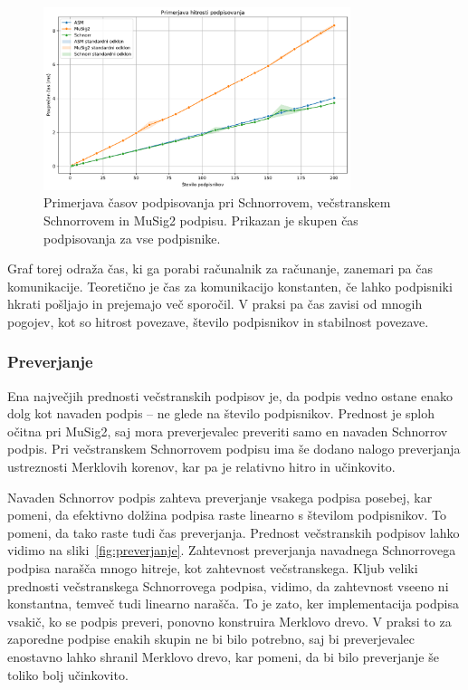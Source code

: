 \documentclass[isrm2, tisk]{fmfdelo}
\begin{document}
\begin{figure}[ht]
  \centering
  \includegraphics[width=0.8\textwidth]{images/benchmark_Signing.pdf}
  \caption[Podpisovanje.]{Primerjava časov podpisovanja pri Schnorrovem, večstranskem Schnorrovem
      in MuSig2 podpisu. Prikazan je skupen čas podpisovanja za vse podpisnike.}
  \label{fig:podpisovanje}
\end{figure}

Graf torej odraža čas, ki ga porabi računalnik za računanje, zanemari pa čas komunikacije. Teoretično
je čas za komunikacijo konstanten, če lahko podpisniki hkrati pošljajo in prejemajo več sporočil.
V praksi pa čas zavisi od mnogih pogojev, kot so hitrost povezave, število podpisnikov in stabilnost
povezave.

\subsubsection{Preverjanje}
Ena največjih prednosti večstranskih podpisov je, da podpis vedno ostane enako dolg kot navaden podpis
– ne glede na število podpisnikov. Prednost je sploh očitna pri MuSig2, saj mora preverjevalec preveriti
samo en navaden Schnorrov podpis. Pri večstranskem Schnorrovem podpisu ima še dodano nalogo preverjanja
ustreznosti Merklovih korenov, kar pa je relativno hitro in učinkovito.

Navaden Schnorrov podpis zahteva preverjanje vsakega podpisa posebej, kar pomeni, da efektivno
dolžina podpisa raste linearno s številom podpisnikov. To pomeni, da tako raste tudi čas preverjanja.
Prednost večstranskih podpisov lahko vidimo na sliki~\ref{fig:preverjanje}. Zahtevnost preverjanja
navadnega Schnorrovega podpisa narašča mnogo hitreje, kot zahtevnost večstranskega. Kljub veliki
prednosti večstranskega Schnorrovega podpisa, vidimo, da zahtevnost vseeno ni konstantna, temveč tudi
linearno narašča. To je zato, ker implementacija podpisa vsakič, ko se podpis preveri, ponovno
konstruira Merklovo drevo. V praksi to za zaporedne podpise enakih skupin ne bi bilo potrebno,
saj bi preverjevalec enostavno lahko shranil Merklovo drevo, kar pomeni, da bi bilo preverjanje še
toliko bolj učinkovito.
\end{document}
